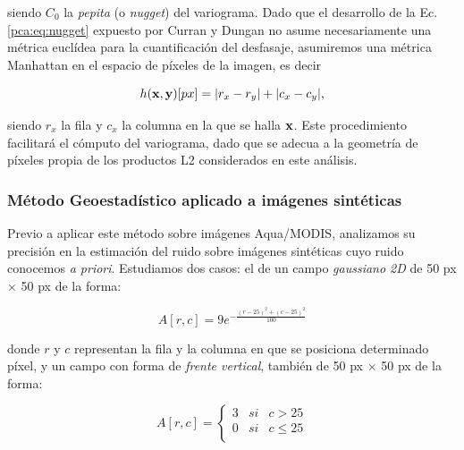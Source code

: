         \noindent siendo $C_{0}$ la \textit{pepita} (o \textit{nugget}) del variograma. Dado que el desarrollo de la Ec. \ref{pca:eq:nugget} expuesto por Curran y Dungan no asume necesariamente una métrica euclídea para la cuantificación del desfasaje, asumiremos una métrica Manhattan en el espacio de píxeles de la imagen, es decir

        \begin{equation}
            h({\bf x},{\bf y})[px] = |r_{x} - r_{y}| + |c_{x} - c_{y}|,
            \label{pca:eq:manhattan}
        \end{equation}
        
        \noindent siendo $r_{x}$ la fila y $c_{x}$ la columna en la que se halla ${\bf x}$. Este procedimiento facilitará el cómputo del variograma, dado que se adecua a la geometría de píxeles propia de los productos L2 considerados en este análisis.


        \subsubsection{Método Geoestadístico aplicado a imágenes sintéticas}
        \label{pca:s:ruidoSinteticas}
            Previo a aplicar este método sobre imágenes Aqua/MODIS, analizamos su precisión en la estimación del ruido sobre imágenes sintéticas cuyo ruido conocemos \textit{a priori}. Estudiamos dos casos: el de un campo \textit{gaussiano 2D} de 50 px $\times$ 50 px de la forma:

            \begin{equation}
                A[r,c] = 9e^{-\frac{(r-25)^{2}+(c-25)^{2}}{100}}
                \label{pca:eq:gaussiano}
            \end{equation}

            \noindent donde $r$ y $c$ representan la fila y la columna en que se posiciona determinado píxel, y un campo con forma de \textit{frente vertical}, también de 50 px $\times$ 50 px de la forma:
            
            \begin{equation}
                A[r,c]      = \left\{ \begin{array}{lcc}
                             3 & si & c >    25\\
                             0 & si & c \leq 25\\
                             \end{array}
                   \right.
                \label{pca:eq:frente}
            \end{equation}


